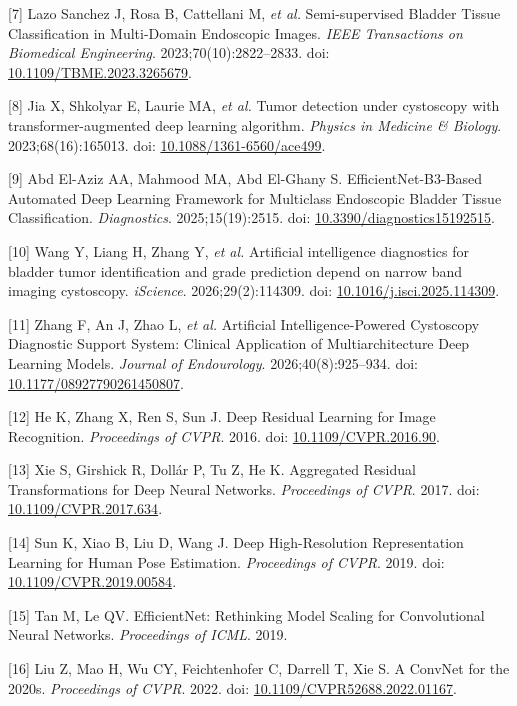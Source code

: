 \documentclass[
  11pt,
  a4paper,
]{article}
\begin{document}
{[}7{]} Lazo Sanchez J, Rosa B, Cattellani M, \emph{et al.}
Semi-supervised Bladder Tissue Classification in Multi-Domain Endoscopic
Images. \emph{IEEE Transactions on Biomedical Engineering}.
2023;70(10):2822--2833. doi:
\href{https://doi.org/10.1109/TBME.2023.3265679}{10.1109/TBME.2023.3265679}.

{[}8{]} Jia X, Shkolyar E, Laurie MA, \emph{et al.} Tumor detection
under cystoscopy with transformer-augmented deep learning algorithm.
\emph{Physics in Medicine \& Biology}. 2023;68(16):165013. doi:
\href{https://doi.org/10.1088/1361-6560/ace499}{10.1088/1361-6560/ace499}.

{[}9{]} Abd El-Aziz AA, Mahmood MA, Abd El-Ghany S.
EfficientNet-B3-Based Automated Deep Learning Framework for Multiclass
Endoscopic Bladder Tissue Classification. \emph{Diagnostics}.
2025;15(19):2515. doi:
\href{https://doi.org/10.3390/diagnostics15192515}{10.3390/diagnostics15192515}.

{[}10{]} Wang Y, Liang H, Zhang Y, \emph{et al.} Artificial intelligence
diagnostics for bladder tumor identification and grade prediction depend
on narrow band imaging cystoscopy. \emph{iScience}. 2026;29(2):114309.
doi:
\href{https://doi.org/10.1016/j.isci.2025.114309}{10.1016/j.isci.2025.114309}.

{[}11{]} Zhang F, An J, Zhao L, \emph{et al.} Artificial
Intelligence-Powered Cystoscopy Diagnostic Support System: Clinical
Application of Multiarchitecture Deep Learning Models. \emph{Journal of
Endourology}. 2026;40(8):925--934. doi:
\href{https://doi.org/10.1177/08927790261450807}{10.1177/08927790261450807}.

{[}12{]} He K, Zhang X, Ren S, Sun J. Deep Residual Learning for Image
Recognition. \emph{Proceedings of CVPR}. 2016. doi:
\href{https://doi.org/10.1109/CVPR.2016.90}{10.1109/CVPR.2016.90}.

{[}13{]} Xie S, Girshick R, Dollár P, Tu Z, He K. Aggregated Residual
Transformations for Deep Neural Networks. \emph{Proceedings of CVPR}.
2017. doi:
\href{https://doi.org/10.1109/CVPR.2017.634}{10.1109/CVPR.2017.634}.

{[}14{]} Sun K, Xiao B, Liu D, Wang J. Deep High-Resolution
Representation Learning for Human Pose Estimation. \emph{Proceedings of
CVPR}. 2019. doi:
\href{https://doi.org/10.1109/CVPR.2019.00584}{10.1109/CVPR.2019.00584}.

{[}15{]} Tan M, Le QV. EfficientNet: Rethinking Model Scaling for
Convolutional Neural Networks. \emph{Proceedings of ICML}. 2019.

{[}16{]} Liu Z, Mao H, Wu CY, Feichtenhofer C, Darrell T, Xie S. A
ConvNet for the 2020s. \emph{Proceedings of CVPR}. 2022. doi:
\href{https://doi.org/10.1109/CVPR52688.2022.01167}{10.1109/CVPR52688.2022.01167}.
\end{document}

